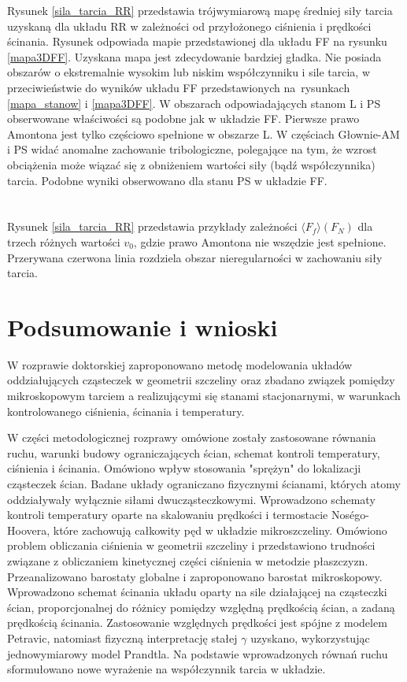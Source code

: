 \documentclass[12pt,a4paper,openright]{report} %
\begin{document}
Rysunek \ref{sila_tarcia_RR} przedstawia trójwymiarową mapę średniej siły tarcia uzyskaną dla układu RR w zależności od przyłożonego ciśnienia i prędkości ścinania.
%
%
Rysunek odpowiada mapie przedstawionej dla układu FF na rysunku \ref{mapa3DFF}. Uzyskana mapa jest zdecydowanie bardziej gładka. Nie posiada obszarów o ekstremalnie wysokim lub niskim współczynniku i sile tarcia, w przeciwieństwie do wyników układu FF przedstawionych na~rysunkach \ref{mapa_stanow} i \ref{mapa3DFF}. W obszarach odpowiadających stanom L i PS obserwowane właściwości są podobne jak w układzie FF. Pierwsze prawo Amontona jest tylko częściowo spełnione w obszarze L. W częściach Głownie-AM i PS widać anomalne zachowanie tribologiczne, polegające na tym, że wzrost obciążenia może wiązać się z obniżeniem wartości siły (bądź współczynnika) tarcia. Podobne wyniki obserwowano dla stanu PS w układzie FF. 
\\
\\
\\
Rysunek \ref{sila_tarcia_RR} przedstawia przykłady zależności $\langle F_f \rangle(F_N)$ dla trzech różnych wartości $v_0$, gdzie prawo Amontona nie wszędzie jest spełnione. Przerywana czerwona linia rozdziela obszar nieregularności w zachowaniu siły tarcia.
%
\chapter{Podsumowanie i wnioski}
W rozprawie doktorskiej zaproponowano metodę modelowania układów oddziałujących cząsteczek w geometrii szczeliny oraz zbadano związek pomiędzy mikroskopowym tarciem a realizującymi się stanami stacjonarnymi, w warunkach kontrolowanego ciśnienia, ścinania i temperatury. 

W części metodologicznej rozprawy omówione zostały zastosowane równania ruchu, warunki budowy ograniczających ścian, schemat kontroli temperatury, ciśnienia i ścinania. Omówiono wpływ stosowania "sprężyn" do lokalizacji cząsteczek ścian. Badane układy ograniczano fizycznymi ścianami, 
których atomy oddziaływały wyłącznie siłami dwucząsteczkowymi. Wprowadzono schematy kontroli temperatury oparte na skalowaniu prędkości i termostacie Nos\'{e}go-Hoovera, które zachowują całkowity pęd w układzie mikroszczeliny. Omówiono problem obliczania ciśnienia w geometrii szczeliny i przedstawiono trudności związane z obliczaniem kinetycznej części ciśnienia w metodzie płaszczyzn. Przeanalizowano barostaty globalne i zaproponowano barostat mikroskopowy. Wprowadzono schemat ścinania układu oparty na sile działającej na cząsteczki ścian, proporcjonalnej do różnicy pomiędzy względną prędkością ścian, a zadaną prędkością ścinania. Zastosowanie względnych prędkości jest spójne z modelem Petravic, natomiast fizyczną interpretację stałej $\gamma$ uzyskano, wykorzystując jednowymiarowy model Prandtla. Na podstawie wprowadzonych równań ruchu sformułowano nowe wyrażenie na współczynnik tarcia w układzie.
\end{document}
